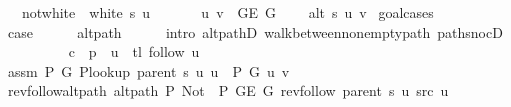 \begin{isabellebody}
\ \ \ not{\isacharunderscore}{\kern0pt}white{\isacharcolon}{\kern0pt}\ {\isachardoublequoteopen}{\isasymnot}\ white\ s\ u{\isachardoublequoteclose}\isanewline
\ \ \isanewline
\ \ \ \ {\isachardoublequoteopen}{\isacharbraceleft}{\kern0pt}u{\isacharcomma}{\kern0pt}\ v{\isacharbraceright}{\kern0pt}\ {\isasymin}\ G{\isachardot}{\kern0pt}E\ G{\isachardoublequoteclose}\isanewline
\ \ \ \ {\isachardoublequoteopen}alt\ s\ u\ v{\isachardoublequoteclose}\isanewline
%
\isadelimproof
%
\endisadelimproof
%
\isatagproof
{}\isamarkupfalse%
\ {\isacharparenleft}{\kern0pt}goal{\isacharunderscore}{\kern0pt}cases{\isacharparenright}{\kern0pt}\isanewline
\ \ \isamarkupfalse%
\ {}\isanewline
\ \ \isamarkupfalse%
\ {\isacharquery}{\kern0pt}case\isanewline
\ \ \ \ \isamarkupfalse%
\ alt{\isacharunderscore}{\kern0pt}path\isanewline
\ \ \ \ \isamarkupfalse%
\ {\isacharparenleft}{\kern0pt}intro\ alt{\isacharunderscore}{\kern0pt}pathD{\isacharparenleft}{\kern0pt}{}{\isacharparenright}{\kern0pt}\ walk{\isacharunderscore}{\kern0pt}between{\isacharunderscore}{\kern0pt}nonempty{\isacharunderscore}{\kern0pt}path{\isacharparenleft}{\kern0pt}{}{\isacharparenright}{\kern0pt}\ path{\isacharunderscore}{\kern0pt}snocD{\isacharparenright}{\kern0pt}\isanewline
{}\isamarkupfalse%
\isanewline
\ \ \isamarkupfalse%
\ {}\isanewline
\ \ \isacommand{{\isacharbraceleft}{\kern0pt}}\isamarkupfalse%
\ \isamarkupfalse%
\ {\isacharquery}{\kern0pt}c\ {\isacharequal}{\kern0pt}\ {\isachardoublequoteopen}p\ {\isacharat}{\kern0pt}\ {\isacharbrackleft}{\kern0pt}u{\isacharbrackright}{\kern0pt}\ {\isacharat}{\kern0pt}\ tl\ {\isacharparenleft}{\kern0pt}follow\ u{\isacharparenright}{\kern0pt}{\isachardoublequoteclose}\isanewline
\ \ \ \ \isamarkupfalse%
\ assm{\isacharcolon}{\kern0pt}\ {\isachardoublequoteopen}P{\isacharprime}{\kern0pt}\ G{}\ {\isacharparenleft}{\kern0pt}P{\isacharunderscore}{\kern0pt}lookup\ {\isacharparenleft}{\kern0pt}parent\ s{\isacharparenright}{\kern0pt}\ u{\isacharparenright}{\kern0pt}\ u\ {\isacharequal}{\kern0pt}\ P\ G{}\ u\ v{\isachardoublequoteclose}\isanewline
\ \ \ \ \isamarkupfalse%
\ rev{\isacharunderscore}{\kern0pt}follow{\isacharunderscore}{\kern0pt}alt{\isacharunderscore}{\kern0pt}path{\isacharcolon}{\kern0pt}\ {\isachardoublequoteopen}alt{\isacharunderscore}{\kern0pt}path\ P{\isacharprime}{\kern0pt}{\isacharprime}{\kern0pt}\ {\isacharparenleft}{\kern0pt}Not\ {\isasymcirc}\ P{\isacharprime}{\kern0pt}{\isacharprime}{\kern0pt}{\isacharparenright}{\kern0pt}\ {\isacharparenleft}{\kern0pt}G{\isachardot}{\kern0pt}E\ G{\isacharparenright}{\kern0pt}\ {\isacharparenleft}{\kern0pt}rev{\isacharunderscore}{\kern0pt}follow\ {\isacharparenleft}{\kern0pt}parent\ s{\isacharparenright}{\kern0pt}\ u{\isacharparenright}{\kern0pt}\ src\ u{\isachardoublequoteclose}\isanewline

\end{isabellebody}
